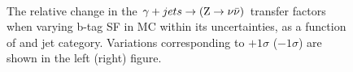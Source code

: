 \begin{figure}[]
  \centering
   ~~
  \\

  \caption{\label{fig:tfSyst_bsf_gjToZinv} The relative change in the
  $\gj \rightarrow (\znunu)$ transfer
  factors when varying b-tag SF in MC within its uncertainties, as a function of \scalht and jet category. 
  Variations corresponding to $+1\sigma$ ($-1\sigma$) are shown in the left (right) figure. 
  }
\end{figure}

